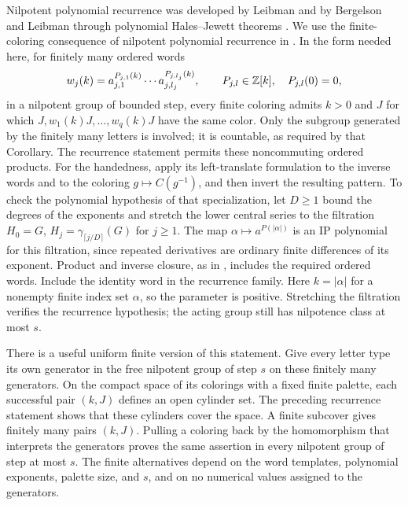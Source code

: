 Nilpotent polynomial recurrence was developed by Leibman
\cite{Leibman1994} and by Bergelson and Leibman through polynomial
Hales--Jewett theorems \cite{BergelsonLeibman1999,BergelsonLeibman2003}.
We use the finite-coloring consequence of nilpotent polynomial recurrence
in \cite[Corollary~3.7]{ZorinKranich}.  In the form needed
here, for finitely many ordered words
\[
 w_j(k)=a_{j,1}^{P_{j,1}(k)}\cdots a_{j,l_j}^{P_{j,l_j}(k)},
 \qquad P_{j,l}\in\mathbb Z[k],\quad P_{j,l}(0)=0,
\]
in a nilpotent group of bounded step, every finite coloring admits $k>0$
and $J$ for which $J,w_1(k)J,\ldots,w_q(k)J$ have the same color.
Only the subgroup generated by the finitely many letters is involved;
it is countable, as required by that Corollary.  The recurrence statement
permits these noncommuting ordered products.
For the handedness, apply its left-translate formulation to the inverse
words and to the coloring $g\mapsto C(g^{-1})$, and then invert the
resulting pattern.  To check the polynomial hypothesis of that
specialization, let $D\ge1$ bound the degrees of the exponents and
stretch the lower central series to the filtration
$H_0=G$, $H_j=\gamma_{\lceil j/D\rceil}(G)$ for $j\ge1$.
The map $\alpha\mapsto a^{P(|\alpha|)}$ is an IP polynomial for
this filtration, since repeated derivatives are ordinary finite
differences of its exponent.  Product and inverse closure, as in
\cite[Theorem~2.5]{ZorinKranich}, includes the required ordered
words.  Include the identity word in the recurrence family.
Here $k=|\alpha|$ for a nonempty finite index set $\alpha$, so the
parameter is positive.  Stretching the filtration verifies the
recurrence hypothesis; the acting group still has nilpotence
class at most $s$.

There is a useful uniform finite version of this statement.  Give every
letter type its own generator in the free nilpotent group of step $s$ on
these finitely many generators.  On the compact space of its colorings
with a fixed finite palette, each successful pair $(k,J)$ defines an open
cylinder set. The preceding recurrence statement shows that these cylinders cover the
space.  A finite subcover gives finitely many pairs $(k,J)$.  Pulling a
coloring back by the homomorphism that interprets the generators proves
the same assertion in every nilpotent group of step at most $s$.  The
finite alternatives depend on the word templates, polynomial exponents,
palette size, and $s$, and on no numerical values assigned to the
generators.

